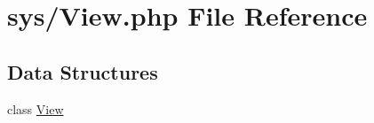 \hypertarget{_view_8php}{}\section{sys/\+View.php File Reference}
\label{_view_8php}
\subsection*{Data Structures}
\begin{DoxyCompactItemize}
\item 
class \hyperlink{class_view}{View}
\end{DoxyCompactItemize}

